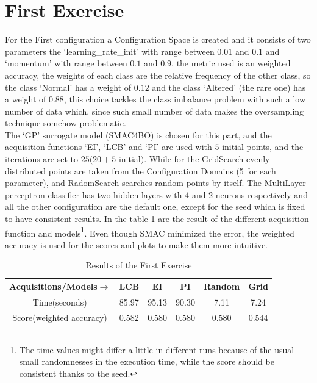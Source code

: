\documentclass[12pt, onecolumn]{article}
\begin{document}
\section*{First Exercise}
For the First configuration a Configuration Space is created and it consists of two parameters the `learning\_rate\_init' with range between $0.01$ and $0.1$ and `momentum'  with range between $0.1$ and $0.9$, the metric used is an weighted accuracy, the weights of each class are the relative frequency of the other class, so the class `Normal' has a weight of $0.12$ and the class `Altered' (the rare one) has a weight of $0.88$, this choice tackles the class imbalance problem with such a low number of data which, since such small number of data makes the oversampling technique somehow problematic.\\
The `GP' surrogate model (SMAC4BO) is chosen for this part, and the acquisition functions `EI', `LCB' and `PI' are used with $5$ initial points, and the iterations are set to $25 (20 + 5$ initial$)$.
While for the GridSearch evenly distributed points are taken from the Configuration Domains (5 for each parameter), and RadomSearch searches random points by itself.
The MultiLayer perceptron classifier has two hidden layers with 4 and 2 neurons respectively and all the other configuration are the default one, except for the seed which is fixed to have consistent results. 
In the table \ref{tab:Ex1_res} are the result of the different acquisition function and models\footnote{The time values might differ a little in different runs because of the usual small randomnesses in the execution time, while the score should be consistent thanks to the seed.}.
Even though SMAC minimized the error, the weighted accuracy is used for the scores and plots to make them more intuitive.

\begin{table}[!h]
  \centering
  \begin{tabular}{ |c|c|c|c|c|c| } 
    \hline
    Acquisitions/Models$\to$ & LCB  & EI & PI & Random & Grid \\
    \hline
    Time(seconds) & 85.97 & 95.13 & 90.30 & 7.11 & 7.24\\
    \hline
    Score(weighted accuracy) & 0.582 & 0.580 & 0.580 & 0.580 & 0.544\\ 
    \hline
  \end{tabular}
  \caption{Results of the First Exercise}
  \label{tab:Ex1_res}
\end{table}
\end{document}
